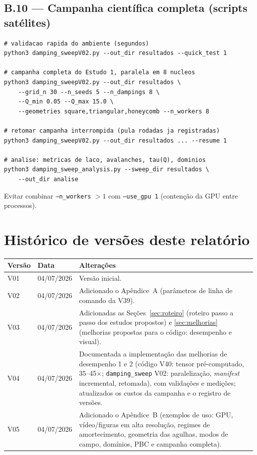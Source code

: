 \documentclass[11pt,a4paper]{article}
\newcommand{\code}[1]{\texttt{#1}}
\begin{document}
\subsection*{B.10 --- Campanha científica completa (scripts satélites)}

\begin{verbatim}
# validacao rapida do ambiente (segundos)
python3 damping_sweepV02.py --out_dir resultados --quick_test 1

# campanha completa do Estudo 1, paralela em 8 nucleos
python3 damping_sweepV02.py --out_dir resultados \
    --grid_n 30 --n_seeds 5 --n_dampings 8 \
    --Q_min 0.05 --Q_max 15.0 \
    --geometries square,triangular,honeycomb --n_workers 8

# retomar campanha interrompida (pula rodadas ja registradas)
python3 damping_sweepV02.py --out_dir resultados ... --resume 1

# analise: metricas de laco, avalanches, tau(Q), dominios
python3 damping_sweep_analysis.py --sweep_dir resultados \
    --out_dir analise
\end{verbatim}
Evitar combinar \code{--n\_workers} $> 1$ com \code{--use\_gpu 1}
(contenção da GPU entre processos).

\section*{Histórico de versões deste relatório}

\begin{tabular}{@{}lll@{}}
\toprule
\textbf{Versão} & \textbf{Data} & \textbf{Alterações} \\
\midrule
V01 & 04/07/2026 & Versão inicial. \\
V02 & 04/07/2026 & Adicionado o Apêndice~A (parâmetros de linha de
comando da V39). \\
V03 & 04/07/2026 & Adicionadas as Seções~\ref{sec:roteiro} (roteiro
passo a passo dos estudos propostos) e \ref{sec:melhorias} (melhorias
propostas para o código: desempenho e visual). \\
V04 & 04/07/2026 & Documentada a implementação das melhorias de
desempenho 1 e 2 (código V40: tensor pré-computado, 35--45$\times$;
\code{damping\_sweep} V02: paralelização, \emph{manifest} incremental,
retomada), com validações e medições; atualizados os custos da campanha
e o registro de versões. \\
V05 & 04/07/2026 & Adicionado o Apêndice~B (exemplos de uso: GPU,
vídeo/figuras em alta resolução, regimes de amortecimento, geometria das
agulhas, modos de campo, domínios, PBC e campanha completa). \\
\bottomrule
\end{tabular}
\end{document}
